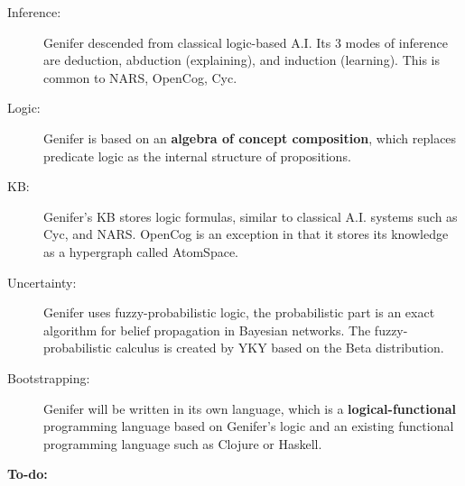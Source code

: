 \documentclass[12pt, UTF8, a4paper]{report}
\theoremstyle{examples} \newtheorem{example}{Example}[section]
\begin{document}
\vspace{1em}
\begin{description}

\item[Inference:] Genifer descended from classical logic-based A.I.  Its 3 modes of inference are deduction, abduction (explaining), and induction (learning).  This is common to NARS, OpenCog, Cyc.

\item[Logic:] Genifer is based on an \textbf{algebra of concept composition}, which replaces predicate logic as the internal structure of propositions.

\item[KB:] Genifer's KB stores logic formulas, similar to classical A.I. systems such as Cyc, and NARS.  OpenCog is an exception in that it stores its knowledge as a hypergraph called AtomSpace.

\item[Uncertainty:] Genifer uses fuzzy-probabilistic logic, the probabilistic part is an exact algorithm for belief propagation in Bayesian networks.  The fuzzy-probabilistic calculus is created by YKY based on the Beta distribution.

\item[Bootstrapping:] Genifer will be written in its own language, which is a \textbf{logical-functional} programming language based on Genifer's logic and an existing functional programming language such as Clojure or Haskell.

\end{description}

\vspace{2em}

\color{TodoColor}

{\sffamily\bfseries\Huge To-do:}
\end{document}
